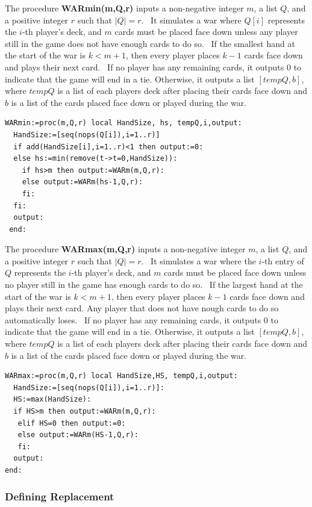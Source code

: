 \documentclass[12pt]{amsart}
\begin{document}
The procedure \textbf{WARmin(m,Q,r)} inputs a non-negative integer $m$, a list $Q$, and a positive integer $r$ such that $|Q|=r$.  It simulates a war where $Q[i]$ represents the $i$-th player's deck, and $m$ cards must be placed face down unless any player still in the game does not have enough cards to do so.  If the smallest hand at the start of the war is $k<m+1$, then every player places $k-1$ cards face down and plays their next card.  If no player has any remaining cards, it outputs 0 to indicate that the game will end in a tie. Otherwise, it outputs a list $[tempQ,b]$, where $tempQ$ is a list of each players deck after placing their cards face down and $b$ is a list of the cards placed face down or played during the war.


\begin{lstlisting}
WARmin:=proc(m,Q,r) local HandSize, hs, tempQ,i,output:
  HandSize:=[seq(nops(Q[i]),i=1..r)]
  if add(HandSize[i],i=1..r)<1 then output:=0:
  else hs:=min(remove(t->t=0,HandSize)):
    if hs>m then output:=WARm(m,Q,r):
    else output:=WARm(hs-1,Q,r):
    fi:
  fi:  
  output:
 end:
\end{lstlisting}




The procedure \textbf{WARmax(m,Q,r)} inputs a non-negative integer $m$, a list $Q$, and a positive integer $r$ such that $|Q|=r$.  It simulates a war where the $i$-th entry of $Q$ represents the $i$-th player's deck, and $m$ cards must be placed face down unless no player still in the game has enough cards to do so.  If the largest hand at the start of the war is $k<m+1$, then every player places $k-1$ cards face down and plays their next card. Any player that does not have nough cards to do so automatically loses.  If no player has any remaining cards, it outputs 0 to indicate that the game will end in a tie. Otherwise, it outputs a list $[tempQ,b]$, where $tempQ$ is a list of each players deck after placing their cards face down and $b$ is a list of the cards placed face down or played during the war.


\begin{lstlisting}
WARmax:=proc(m,Q,r) local HandSize,HS, tempQ,i,output:
  HandSize:=[seq(nops(Q[i]),i=1..r)]:
  HS:=max(HandSize):
  if HS>m then output:=WARm(m,Q,r):
   elif HS=0 then output:=0:
   else output:=WARm(HS-1,Q,r):
   fi:
  output:
end: 
\end{lstlisting}




\subsubsection{Defining Replacement}\hfill
\end{document}
